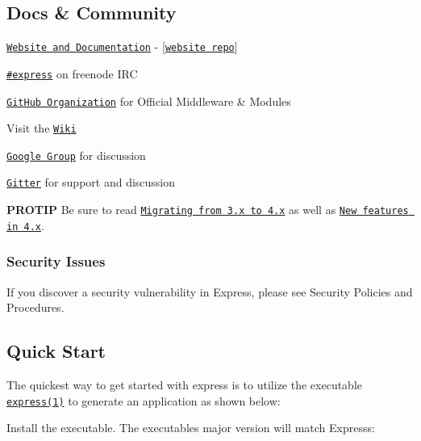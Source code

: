 \subsection*{Docs \& Community}


\begin{DoxyItemize}
\item \href{http://expressjs.com/}{\tt Website and Documentation} -\/ \mbox{[}\href{https://github.com/expressjs/expressjs.com}{\tt website repo}\mbox{]}
\item \href{https://webchat.freenode.net/?channels=express}{\tt \#express} on freenode I\+RC
\item \href{https://github.com/expressjs}{\tt Git\+Hub Organization} for Official Middleware \& Modules
\item Visit the \href{https://github.com/expressjs/express/wiki}{\tt Wiki}
\item \href{https://groups.google.com/group/express-js}{\tt Google Group} for discussion
\item \href{https://gitter.im/expressjs/express}{\tt Gitter} for support and discussion
\end{DoxyItemize}

{\bfseries P\+R\+O\+T\+IP} Be sure to read \href{https://github.com/expressjs/express/wiki/Migrating-from-3.x-to-4.x}{\tt Migrating from 3.\+x to 4.\+x} as well as \href{https://github.com/expressjs/express/wiki/New-features-in-4.x}{\tt New features in 4.\+x}.

\subsubsection*{Security Issues}

If you discover a security vulnerability in Express, please see Security Policies and Procedures.

\subsection*{Quick Start}

The quickest way to get started with express is to utilize the executable \href{https://github.com/expressjs/generator}{\tt {\ttfamily express(1)}} to generate an application as shown below\+:

Install the executable. The executable\textquotesingle{}s major version will match Express\textquotesingle{}s\+:




